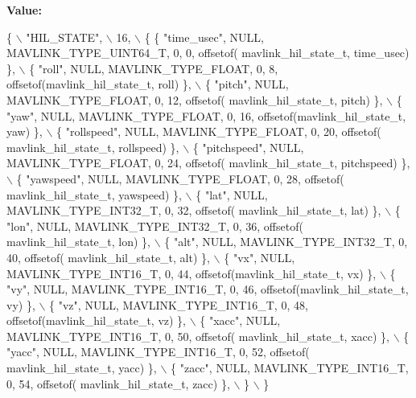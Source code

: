 {\bfseries Value\+:}
\begin{DoxyCode}
\{ \(\backslash\)
    \textcolor{stringliteral}{"HIL\_STATE"}, \(\backslash\)
    16, \(\backslash\)
    \{  \{ \textcolor{stringliteral}{"time\_usec"}, NULL, MAVLINK_TYPE_UINT64_T, 0, 0, offsetof(
      mavlink_hil_state_t, time\_usec) \}, \(\backslash\)
         \{ \textcolor{stringliteral}{"roll"}, NULL, MAVLINK_TYPE_FLOAT, 0, 8, offsetof(mavlink_hil_state_t, roll) \}, \(\backslash\)
         \{ \textcolor{stringliteral}{"pitch"}, NULL, MAVLINK_TYPE_FLOAT, 0, 12, offsetof(
      mavlink_hil_state_t, pitch) \}, \(\backslash\)
         \{ \textcolor{stringliteral}{"yaw"}, NULL, MAVLINK_TYPE_FLOAT, 0, 16, offsetof(mavlink_hil_state_t, yaw) \}, \(\backslash\)
         \{ \textcolor{stringliteral}{"rollspeed"}, NULL, MAVLINK_TYPE_FLOAT, 0, 20, offsetof(
      mavlink_hil_state_t, rollspeed) \}, \(\backslash\)
         \{ \textcolor{stringliteral}{"pitchspeed"}, NULL, MAVLINK_TYPE_FLOAT, 0, 24, offsetof(
      mavlink_hil_state_t, pitchspeed) \}, \(\backslash\)
         \{ \textcolor{stringliteral}{"yawspeed"}, NULL, MAVLINK_TYPE_FLOAT, 0, 28, offsetof(
      mavlink_hil_state_t, yawspeed) \}, \(\backslash\)
         \{ \textcolor{stringliteral}{"lat"}, NULL, MAVLINK_TYPE_INT32_T, 0, 32, offsetof(
      mavlink_hil_state_t, lat) \}, \(\backslash\)
         \{ \textcolor{stringliteral}{"lon"}, NULL, MAVLINK_TYPE_INT32_T, 0, 36, offsetof(
      mavlink_hil_state_t, lon) \}, \(\backslash\)
         \{ \textcolor{stringliteral}{"alt"}, NULL, MAVLINK_TYPE_INT32_T, 0, 40, offsetof(
      mavlink_hil_state_t, alt) \}, \(\backslash\)
         \{ \textcolor{stringliteral}{"vx"}, NULL, MAVLINK_TYPE_INT16_T, 0, 44, offsetof(mavlink_hil_state_t, vx) \}, \(\backslash\)
         \{ \textcolor{stringliteral}{"vy"}, NULL, MAVLINK_TYPE_INT16_T, 0, 46, offsetof(mavlink_hil_state_t, vy) \}, \(\backslash\)
         \{ \textcolor{stringliteral}{"vz"}, NULL, MAVLINK_TYPE_INT16_T, 0, 48, offsetof(mavlink_hil_state_t, vz) \}, \(\backslash\)
         \{ \textcolor{stringliteral}{"xacc"}, NULL, MAVLINK_TYPE_INT16_T, 0, 50, offsetof(
      mavlink_hil_state_t, xacc) \}, \(\backslash\)
         \{ \textcolor{stringliteral}{"yacc"}, NULL, MAVLINK_TYPE_INT16_T, 0, 52, offsetof(
      mavlink_hil_state_t, yacc) \}, \(\backslash\)
         \{ \textcolor{stringliteral}{"zacc"}, NULL, MAVLINK_TYPE_INT16_T, 0, 54, offsetof(
      mavlink_hil_state_t, zacc) \}, \(\backslash\)
         \} \(\backslash\)
\}
\end{DoxyCode}
\mbox{\label{mavlink__msg__hil__state_8h_ad2996e55cef54cf50dba0b2c9610ed28}} 
